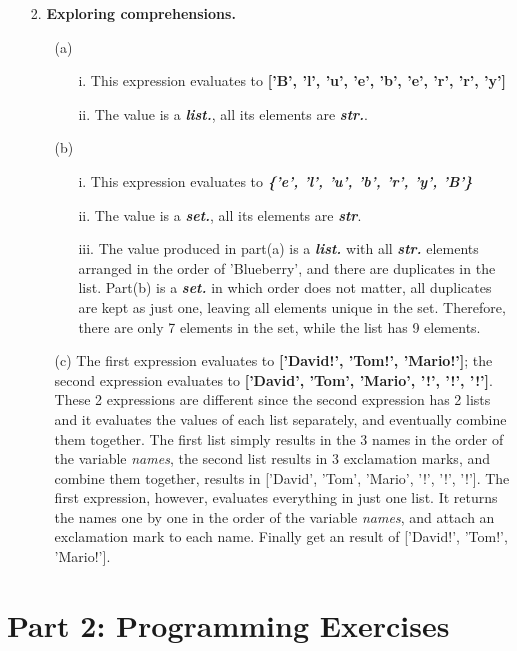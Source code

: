 \begin{enumerate}
\item[2.] \textbf{Exploring comprehensions.}

\begin{enumerate}
\item[(a)]
\begin{enumerate}
    \item[i.] This expression evaluates to \textbf{['B', 'l', 'u', 'e', 'b', 'e', 'r', 'r', 'y']}
    \item[ii.] The value is a \textbf{\textit{list.}}, all its elements are \textbf{\textit{str.}}.
\end{enumerate}
\item[(b)]
\begin{enumerate}
    \item[i.] This expression evaluates to \textbf{\textit{\{'e', 'l', 'u', 'b', 'r', 'y', 'B'\}}}
    \item[ii.] The value is a \textbf{\textit{set.}}, all its elements are \textbf{\textit{str}}.
    \item[iii.] The value produced in part(a) is a \textit{\textbf{list.}} with all \textit{\textbf{str.}} elements arranged in the order of 'Blueberry', and there are duplicates in the list. Part(b) is a \textit{\textbf{set.}} in which order does not matter, all duplicates are kept as just one, leaving all elements unique in the set. Therefore, there are only 7 elements in the set, while the list has 9 elements.
\end{enumerate}
\item[(c)]
The first expression evaluates to \textbf{['David!', 'Tom!', 'Mario!']}; the second expression evaluates to \textbf{['David', 'Tom', 'Mario', '!', '!', '!']}. These 2 expressions are different since the second expression has 2 lists and it evaluates the values of each list separately, and eventually combine them together. The first list simply results in the 3 names in the order of the variable \textit{names}, the second list results in 3 exclamation marks, and combine them together, results in ['David', 'Tom', 'Mario', '!', '!', '!']. The first expression, however, evaluates everything in just one list. It returns the names one by one in the order of the variable \textit{names}, and attach an exclamation mark to each name. Finally get an result of ['David!', 'Tom!', 'Mario!'].
\end{enumerate}
\end{enumerate}

\section*{Part 2: Programming Exercises}

